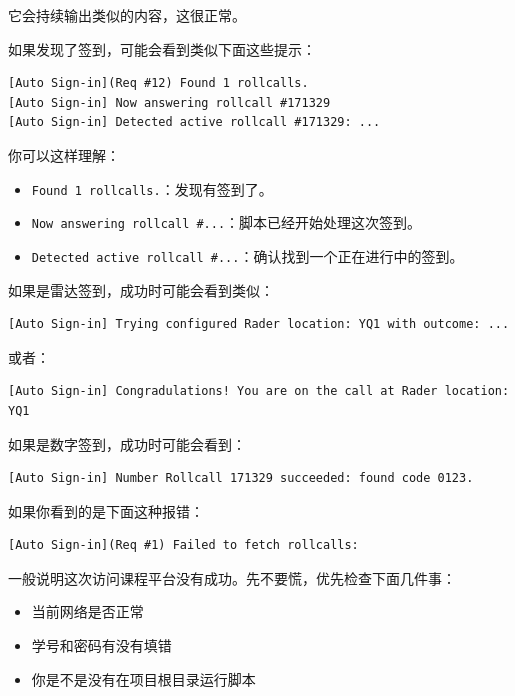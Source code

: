 \documentclass[UTF8,12pt]{ctexart}
\begin{document}
\noindent 它会持续输出类似的内容，这很正常。

\noindent 如果发现了签到，可能会看到类似下面这些提示：

\begin{verbatim}
[Auto Sign-in](Req #12) Found 1 rollcalls.
[Auto Sign-in] Now answering rollcall #171329
[Auto Sign-in] Detected active rollcall #171329: ...
\end{verbatim}

\noindent 你可以这样理解：

\begin{itemize}
  \item \texttt{Found 1 rollcalls.}：发现有签到了。
  \item \texttt{Now answering rollcall \#...}：脚本已经开始处理这次签到。
  \item \texttt{Detected active rollcall \#...}：确认找到一个正在进行中的签到。
\end{itemize}

\noindent 如果是雷达签到，成功时可能会看到类似：

\begin{verbatim}
[Auto Sign-in] Trying configured Rader location: YQ1 with outcome: ...
\end{verbatim}

\noindent 或者：

\begin{verbatim}
[Auto Sign-in] Congradulations! You are on the call at Rader location: YQ1
\end{verbatim}

\noindent 如果是数字签到，成功时可能会看到：

\begin{verbatim}
[Auto Sign-in] Number Rollcall 171329 succeeded: found code 0123.
\end{verbatim}

\noindent 如果你看到的是下面这种报错：

\begin{verbatim}
[Auto Sign-in](Req #1) Failed to fetch rollcalls:
\end{verbatim}

\noindent 一般说明这次访问课程平台没有成功。先不要慌，优先检查下面几件事：

\begin{itemize}
  \item 当前网络是否正常
  \item 学号和密码有没有填错
  \item 你是不是没有在项目根目录运行脚本
\end{itemize}
\end{document}
